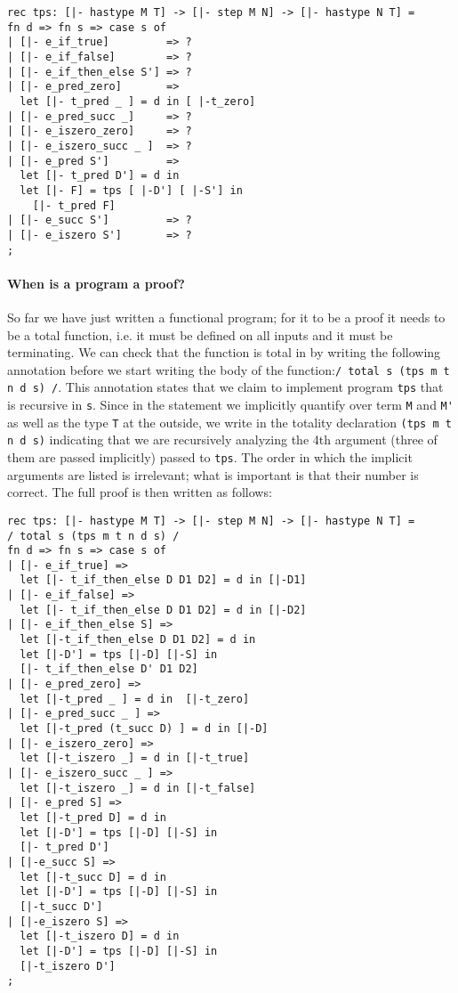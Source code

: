 \begin{lstlisting}
rec tps: [|- hastype M T] -> [|- step M N] -> [|- hastype N T] =
fn d => fn s => case s of
| [|- e_if_true]         => ?
| [|- e_if_false]        => ?
| [|- e_if_then_else S'] => ?
| [|- e_pred_zero]       =>
  let [|- t_pred _ ] = d in [ |-t_zero]
| [|- e_pred_succ _]     => ?
| [|- e_iszero_zero]     => ?
| [|- e_iszero_succ _ ]  => ?
| [|- e_pred S']         =>
  let [|- t_pred D'] = d in
  let [|- F] = tps [ |-D'] [ |-S'] in
    [|- t_pred F]
| [|- e_succ S']         => ?
| [|- e_iszero S']       => ?
;
\end{lstlisting}

\paragraph{When is a program a proof?} So far we have just written a functional
program; for it to be a proof it needs to be a total function, i.e. it must be
defined on all inputs and it must be terminating. We can check that the function
is total in \beluga by writing the following annotation before we start writing
the body of the function:\lstinline!/ total s (tps m t n d s) /!. This
annotation states that we claim to implement program \lstinline!tps! that is
recursive in \lstinline!s!. Since in the statement we implicitly quantify over
term \lstinline!M! and \lstinline!M'! as well as the type \lstinline!T! at the
outside, we write in the totality declaration
\lstinline!(tps m t n d s)! indicating that we are recursively analyzing the 4th
argument (three of them are passed implicitly) passed to \lstinline!tps!. The
order in which the implicit arguments are listed is irrelevant; what is
important is that their number is correct. The full proof is then written as
follows:

\begin{lstlisting}
rec tps: [|- hastype M T] -> [|- step M N] -> [|- hastype N T] =
/ total s (tps m t n d s) /
fn d => fn s => case s of
| [|- e_if_true] =>
  let [|- t_if_then_else D D1 D2] = d in [|-D1]
| [|- e_if_false] =>
  let [|- t_if_then_else D D1 D2] = d in [|-D2]
| [|- e_if_then_else S] =>
  let [|-t_if_then_else D D1 D2] = d in
  let [|-D'] = tps [|-D] [|-S] in
  [|- t_if_then_else D' D1 D2]
| [|- e_pred_zero] =>
  let [|-t_pred _ ] = d in  [|-t_zero]
| [|- e_pred_succ _ ] =>
  let [|-t_pred (t_succ D) ] = d in [|-D]
| [|- e_iszero_zero] =>
  let [|-t_iszero _] = d in [|-t_true]
| [|- e_iszero_succ _ ] =>
  let [|-t_iszero _] = d in [|-t_false]
| [|- e_pred S] =>
  let [|-t_pred D] = d in
  let [|-D'] = tps [|-D] [|-S] in
  [|- t_pred D']
| [|-e_succ S] =>
  let [|-t_succ D] = d in
  let [|-D'] = tps [|-D] [|-S] in
  [|-t_succ D']
| [|-e_iszero S] =>
  let [|-t_iszero D] = d in
  let [|-D'] = tps [|-D] [|-S] in
  [|-t_iszero D']
;
\end{lstlisting}

